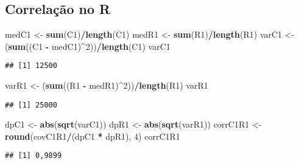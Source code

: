 \documentclass[
]{book}
\newenvironment{Shaded}{\begin{snugshade}}{\end{snugshade}}
\newcommand{\DecValTok}[1]{\textcolor[rgb]{0.00,0.00,0.81}{#1}}
\newcommand{\KeywordTok}[1]{\textcolor[rgb]{0.13,0.29,0.53}{\textbf{#1}}}
\newcommand{\NormalTok}[1]{#1}
\newcommand{\OperatorTok}[1]{\textcolor[rgb]{0.81,0.36,0.00}{\textbf{#1}}}
\newcommand{\StringTok}[1]{\textcolor[rgb]{0.31,0.60,0.02}{#1}}
\begin{document}
\hypertarget{correlauxe7uxe3o-no-r}{%
\subsection{Correlação no R}\label{correlauxe7uxe3o-no-r}}

\begin{Shaded}
\begin{Highlighting}[]
\NormalTok{medC1 <-}\StringTok{ }\KeywordTok{sum}\NormalTok{(C1)}\OperatorTok{/}\KeywordTok{length}\NormalTok{(C1)}
\NormalTok{medR1 <-}\StringTok{ }\KeywordTok{sum}\NormalTok{(R1)}\OperatorTok{/}\KeywordTok{length}\NormalTok{(R1)}
\NormalTok{varC1 <-}\StringTok{ }\NormalTok{(}\KeywordTok{sum}\NormalTok{((C1 }\OperatorTok{-}\StringTok{ }\NormalTok{medC1)}\OperatorTok{^}\DecValTok{2}\NormalTok{))}\OperatorTok{/}\KeywordTok{length}\NormalTok{(C1)}
\NormalTok{varC1}
\end{Highlighting}
\end{Shaded}

\begin{verbatim}
## [1] 12500
\end{verbatim}

\begin{Shaded}
\begin{Highlighting}[]
\NormalTok{varR1 <-}\StringTok{ }\NormalTok{(}\KeywordTok{sum}\NormalTok{((R1 }\OperatorTok{-}\StringTok{ }\NormalTok{medR1)}\OperatorTok{^}\DecValTok{2}\NormalTok{))}\OperatorTok{/}\KeywordTok{length}\NormalTok{(R1)}
\NormalTok{varR1}
\end{Highlighting}
\end{Shaded}

\begin{verbatim}
## [1] 25000
\end{verbatim}

\begin{Shaded}
\begin{Highlighting}[]
\NormalTok{dpC1 <-}\StringTok{ }\KeywordTok{abs}\NormalTok{(}\KeywordTok{sqrt}\NormalTok{(varC1))}
\NormalTok{dpR1 <-}\StringTok{ }\KeywordTok{abs}\NormalTok{(}\KeywordTok{sqrt}\NormalTok{(varR1))}
\NormalTok{corrC1R1 <-}\StringTok{ }\KeywordTok{round}\NormalTok{(covC1R1}\OperatorTok{/}\NormalTok{(dpC1 }\OperatorTok{*}\StringTok{ }\NormalTok{dpR1), }\DecValTok{4}\NormalTok{)}
\NormalTok{corrC1R1}
\end{Highlighting}
\end{Shaded}

\begin{verbatim}
## [1] 0,9899
\end{verbatim}
\end{document}
